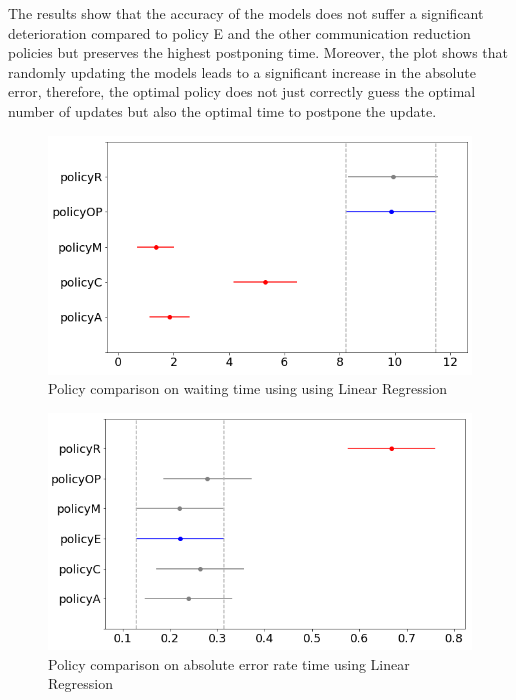 \documentclass{mpaper}
\begin{document}
The results show that the accuracy of the models does not suffer a significant deterioration compared to policy E and the other communication reduction policies but preserves the highest postponing time. Moreover, the plot shows that randomly updating the models leads to a significant increase in the absolute error, therefore, the optimal policy does not just correctly guess the optimal number of updates but also the optimal time to postpone the update. 
\begin{figure}[h]
    \centering
    \includegraphics[scale=0.35]{imgs/lin_reg_pi3_waiting_plot_diff_means.png}
    \caption{Policy comparison on waiting time using using Linear Regression}
    \label{fig:lin_reg_pi3_waiting_plot_diff_means}
\end{figure}
\begin{figure}[h]
    \centering
    \includegraphics[scale=0.35]{imgs/lin_reg_pi3_error_plot_diff_means.png}
    \caption{Policy comparison on absolute error rate time using Linear Regression}
    \label{fig:lin_reg_pi3_waiting_plot_diff_means}
\end{figure}
\end{document}

